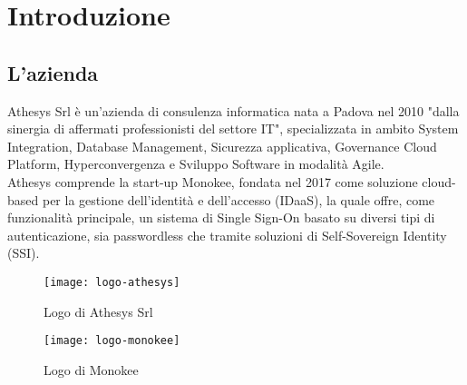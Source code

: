 
\chapter{Introduzione}
\label{cap:introduzione}






\section{L'azienda}

Athesys Srl è un'azienda di consulenza informatica nata a Padova nel 2010 "dalla sinergia di affermati professionisti del settore IT", specializzata in ambito
System Integration, Database Management, Sicurezza applicativa, Governance Cloud Platform, Hyperconvergenza e
Sviluppo Software in modalità Agile. \\
Athesys comprende la start-up Monokee, fondata nel 2017 come soluzione cloud-based per la gestione dell'identità
e dell'accesso (IDaaS), la quale offre, come funzionalità principale, un sistema di Single Sign-On basato 
su diversi tipi di autenticazione, sia passwordless che tramite soluzioni di Self-Sovereign Identity (SSI).

\vspace{20pt}
\begin{figure}[!h] 
    \centering 
    \texttt{[image: logo-athesys]} 
    \caption{Logo di Athesys Srl}
\end{figure}

\begin{figure}[!h] 
    \centering 
    \texttt{[image: logo-monokee]} 
    \caption{Logo di Monokee}
\end{figure}
    


